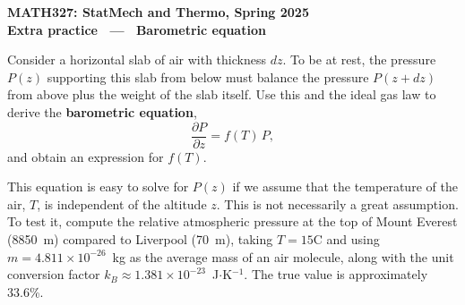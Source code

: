 \documentclass[12 pt]{article} %
\begin{document}
\newcommand{\thisunit}{MATH327 Extra (Barom.~eq.)}
\newcommand{\moddate}{Last modified 27 Apr.~2025}
\begin{center}
  {\Large \textbf{MATH327: StatMech and Thermo, Spring 2025}} \\[12 pt]
  {\Large \textbf{Extra practice \ --- \ Barometric equation}} \\[24 pt]
\end{center}

Consider a horizontal slab of air with thickness $dz$.
To be at rest, the pressure $P(z)$ supporting this slab from below must balance the pressure $P(z + dz)$ from above plus the weight of the slab itself.
Use this and the ideal gas law to derive the \textbf{barometric equation},
\begin{equation*}
  \frac{\partial P}{\partial z} = f(T) \, P,
\end{equation*}
and obtain an expression for $f(T)$.

This equation is easy to solve for $P(z)$ if we assume that the temperature of the air, $T$, is independent of the altitude $z$.
This is not necessarily a great assumption.
To test it, compute the relative atmospheric pressure at the top of Mount Everest (8850~m) compared to Liverpool (70~m), taking $T = 15${\textdegree}C and using $m = 4.811\times 10^{-26}$~kg as the average mass of an air molecule, along with the unit conversion factor $k_B \approx 1.381\times 10^{-23}$~J$\cdot$K$^{-1}$.
The true value is approximately 33.6\%.
\end{document}
